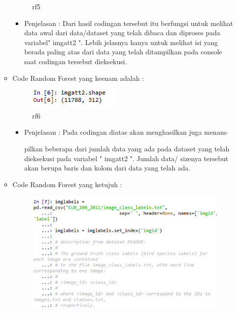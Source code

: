 \begin{enumerate}
\begin{itemize}
\begin{figure}[ht]
\caption{rf5}
\label{contoh}
\end{figure}
\par
\begin{itemize}
\item Penjelasan : Dari hasil codingan tersebut itu berfungsi untuk melihat data awal dari data/dataset yang telah dibaca dan diproses pada variabel" imgatt2 ". Lebih jelasnya hanya untuk melihat isi yang berada paling atas dari data yang telah  ditampilkan pada console saat codingan tersebut  dieksekusi.
\par
\par
\end{itemize}
\item Code Random Forest yang keenam adalah :
\par
\begin{figure}[ht]
\centering
\includegraphics[scale=0.4]{figures/rf6.png}
\caption{rf6}
\label{contoh}
\end{figure}
\par
\begin{itemize}\item Penjelasan : Pada codingan diatas akan menghasilkan juga menam-
\par pilkan beberapa dari jumlah data yang ada pada dataset yang telah dieksekusi pada variabel " imgatt2 ". Jumlah data/ sizenya tersebut akan berupa baris dan kolom dari data yang telah ada.
\par
\par
\end{itemize}
\item Code Random Forest yang ketujuh :
\par
\begin{figure}[ht]
\centering
\includegraphics[scale=0.2]{figures/rf7.png}

\end{figure}
\end{itemize}
\end{enumerate}
